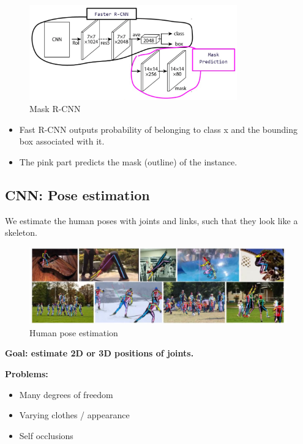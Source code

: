 \documentclass[a4paper]{article}
\begin{document}
\begin{figure}[H]
\centering
\includegraphics[width=0.8\textwidth]{figures/Mask_RCNN.png}
\caption{Mask R-CNN}
\label{fig:mask_RCNN}
\end{figure} 

\begin{itemize}
	\item Fast R-CNN outputs probability of belonging to class x and the bounding box associated with it. 
	\item The pink part predicts the mask (outline) of the instance. 
\end{itemize}


\newpage
\subsection{CNN: Pose estimation}
We estimate the human poses with joints and links, such that they look like a skeleton. 
\begin{figure}[H]
\centering
\includegraphics[width=0.99\textwidth]{figures/Human_pose_estimation.png}
\caption{Human pose estimation}
\label{fig:human_pose_estimation}
\end{figure} 

\textbf{Goal: estimate 2D or 3D positions of joints. } 

\textbf{Problems:} 
\begin{itemize}
	\item Many degrees of freedom
	\item Varying clothes / appearance
	\item Self occlusions
\end{itemize}
\end{document}
